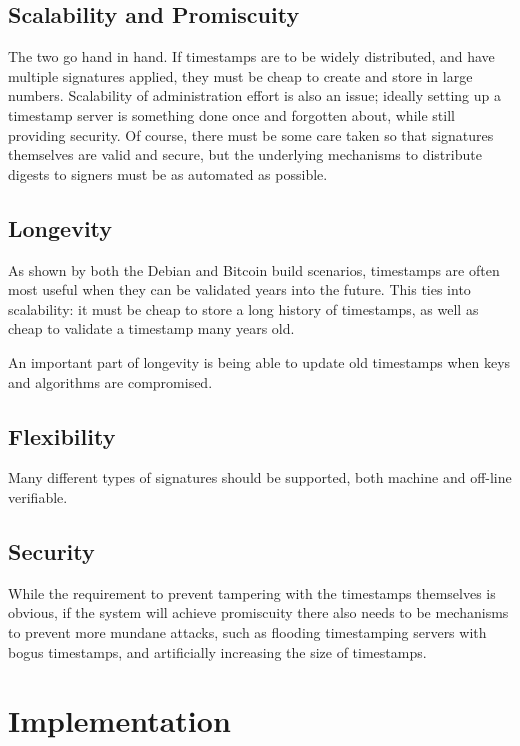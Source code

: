 \documentclass{article}
\begin{document}
\subsection{Scalability and Promiscuity}

The two go hand in hand. If timestamps are to be widely distributed, and have
multiple signatures applied, they must be cheap to create and store in large
numbers. Scalability of administration effort is also an issue; ideally setting
up a timestamp server is something done once and forgotten about, while still
providing security. Of course, there must be some care taken so that signatures
themselves are valid and secure, but the underlying mechanisms to distribute
digests to signers must be as automated as possible.


\subsection{Longevity}

As shown by both the Debian and Bitcoin build scenarios, timestamps are often
most useful when they can be validated years into the future. This ties into
scalability: it must be cheap to store a long history of timestamps, as well as
cheap to validate a timestamp many years old.

An important part of longevity is being able to update old timestamps when keys
and algorithms are compromised.


\subsection{Flexibility}

Many different types of signatures should be supported, both machine and
off-line verifiable.

\subsection{Security}

While the requirement to prevent tampering with the timestamps themselves is
obvious, if the system will achieve promiscuity there also needs to be
mechanisms to prevent more mundane attacks, such as flooding timestamping
servers with bogus timestamps, and artificially increasing the size of
timestamps.


\section{Implementation}
\end{document}
